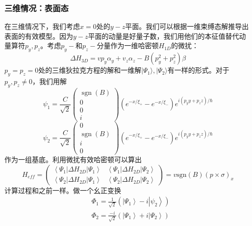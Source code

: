 \documentclass{article}
\numberwithin{equation}{subsection}
\begin{document}
\subsubsection{三维情况：表面态}
在三维情况下，我们考虑$x=0$处的$y-z$平面。我们可以根据一维束缚态解推导出表面的有效模型。因为$y-z$平面的动量是好量子数，我们用他们的本征值替代动量算符$p_y,p_z$。考虑$p_y-$和$p_z-$分量作为一维哈密顿$H_{1D}$的微扰：
\begin{equation}
    \Delta H_{3D}=vp_y\alpha_y+v_z\alpha_z-B(p_y^2+p_z^2)\beta
\end{equation}
$p_y=p_z=0$处的三维狄拉克方程的解和一维解$|\Psi_1\rangle,|\Psi_2\rangle$有一样的形式。对于$p_y,p_z\neq0$，我们用解
\begin{equation}
    \psi_{1}=\frac{C}{\sqrt{2}}\left(\begin{array}{c}
        \operatorname{sgn}(B) \\
        0 \\
        0 \\
        i
        \end{array}\right)\left(e^{-x / \xi_{+}}-e^{-x / \xi_{-}}\right) e^{i\left(p_{y} y+p_{z} z\right) / \hbar}
\end{equation}
\begin{equation}
    \psi_{2}=\frac{C}{\sqrt{2}}\left(\begin{array}{c}
        0 \\
        \operatorname{sgn}(B) \\
        i \\
        0
        \end{array}\right)\left(e^{-x / \xi_{+}}-e^{-x / \xi_{-}}\right) e^{i\left(p_{y} y+p_{z} z\right) / \hbar}
\end{equation}
作为一组基底。利用微扰有效哈密顿可以算出
\begin{equation}
    H_{e f f}=\left(\begin{array}{cc}
        \left\langle\Psi_{1}\left|\Delta H_{2 D}\right| \Psi_{1}\right\rangle & \left\langle\Psi_{1}\left|\Delta H_{2 D}\right| \Psi_{2}\right\rangle \\
        \left\langle\Psi_{2}\left|\Delta H_{2 D}\right| \Psi_{1}\right\rangle & \left\langle\Psi_{2}\left|\Delta H_{2 D}\right| \Psi_{2}\right\rangle
        \end{array}\right)=v\mathrm{sgn}(B)(p\times\sigma)_x
\end{equation}
计算过程和之前一样。做一个幺正变换
\begin{equation}
    \begin{aligned}
        &\Phi_{1}=\frac{1}{\sqrt{2}}\left(\left|\Psi_{1}\right\rangle-i\left|\psi_{2}\right\rangle\right)\\
        &\Phi_{2}=\frac{-i}{\sqrt{2}}\left(\left|\Psi_{1}\right\rangle+i\left|\Psi_{2}\right\rangle\right)
    \end{aligned}
\end{equation}
\end{document}
